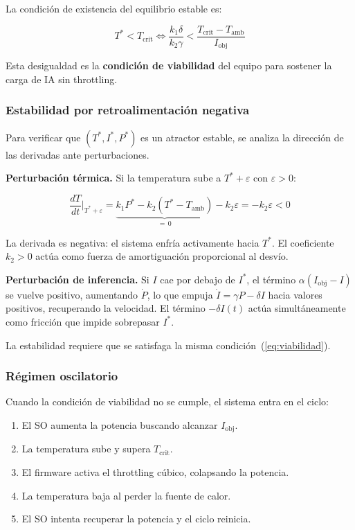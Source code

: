 \documentclass[10pt, twocolumn]{article}
\begin{document}
La condición de existencia del equilibrio estable es:

\begin{equation}
  T^* < T_{\text{crit}} \iff \frac{k_1 \delta}{k_2 \gamma} < \frac{T_{\text{crit}} - T_{\text{amb}}}{I_{\text{obj}}}
  \label{eq:viabilidad}
\end{equation}

Esta desigualdad es la \textbf{condición de viabilidad} del equipo para sostener
la carga de IA sin throttling.

\subsubsection{Estabilidad por retroalimentación negativa}

Para verificar que $(T^*, I^*, P^*)$ es un atractor estable, se analiza la
dirección de las derivadas ante perturbaciones.

\smallskip\noindent\textbf{Perturbación térmica.} Si la temperatura sube a
$T^* + \varepsilon$ con $\varepsilon > 0$:

\begin{equation*}
  \frac{dT}{dt}\bigg|_{T^*+\varepsilon}
  = \underbrace{k_1 P^* - k_2(T^*-T_{\text{amb}})}_{=\,0} - k_2\varepsilon = -k_2\varepsilon < 0
\end{equation*}

La derivada es negativa: el sistema enfría activamente hacia $T^*$. El coeficiente
$k_2 > 0$ actúa como fuerza de amortiguación proporcional al desvío.

\smallskip\noindent\textbf{Perturbación de inferencia.} Si $I$ cae por debajo
de $I^*$, el término $\alpha(I_{\text{obj}} - I)$ se vuelve positivo, aumentando
$\dot{P}$, lo que empuja $\dot{I} = \gamma P - \delta I$ hacia valores positivos,
recuperando la velocidad. El término $-\delta I(t)$ actúa simultáneamente como
fricción que impide sobrepasar $I^*$.

La estabilidad requiere que se satisfaga la misma condición~(\ref{eq:viabilidad}).

\subsubsection{Régimen oscilatorio}

Cuando la condición de viabilidad no se cumple, el sistema entra en el ciclo:

\begin{enumerate}
  \item El SO aumenta la potencia buscando alcanzar $I_{\text{obj}}$.
  \item La temperatura sube y supera $T_{\text{crit}}$.
  \item El firmware activa el throttling cúbico, colapsando la potencia.
  \item La temperatura baja al perder la fuente de calor.
  \item El SO intenta recuperar la potencia y el ciclo reinicia.
\end{enumerate}
\end{document}
